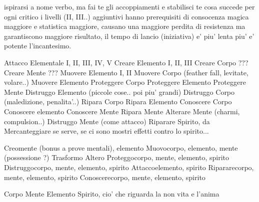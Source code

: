 \documentclass[12pt,a4paper,twoside,openany]{book}
\begin{document}
ispirarsi a nome verbo, ma fai te gli accoppiamenti e stabilisci te cosa succede per ogni critico 
i livelli (II, III..) aggiuntivi hanno prerequisiti di consocenza magica maggiore e statistica maggiore, causano una maggiore perdita di resistenza ma garantiscono maggiore risultato, il tempo di lancio (iniziativa) e' piu' lenta piu' e' potente l'incantesimo.

Attacco Elementale I, II, III, IV, V
Creare Elemento I, II, III
Creare Corpo  ???
Creare Mente  ???
Muovere Elemento I, II
Muovere Corpo (feather fall, levitate, volare..)
Muovere Elemento
Proteggere Corpo
Proteggere Elemento 
Proteggere Mente
Distruggo Elemento (piccole cose.. poi piu' grandi)
Distruggo Corpo (maledizione, penalita'..)
Ripara Corpo
Ripara Elemento
Conoscere Corpo
Conoscere elemento
Conoscere Mente
Ripara Mente
Alterare Mente (charmi, compulsion..)
Distruggo Mente (come attacco)
Riparare Spirito, da Mercanteggiare se serve, se ci sono mostri effetti contro lo spirito...


Creomente (bonus a prove mentali), elemento
Muovocorpo, elemento, mente (possessione ?)
Trasformo
Altero
Proteggocorpo, mente, elemento, spirito
Distruggocorpo, mente, elemento, spirito
Attaccoelemento, spirito
Ripararecorpo, mente, elemento, spirito
Conoscerecorpo, mente, elemento, spirito

Corpo
Mente
Elemento
Spirito, cio' che riguarda la non vita e l'anima
\end{document}
